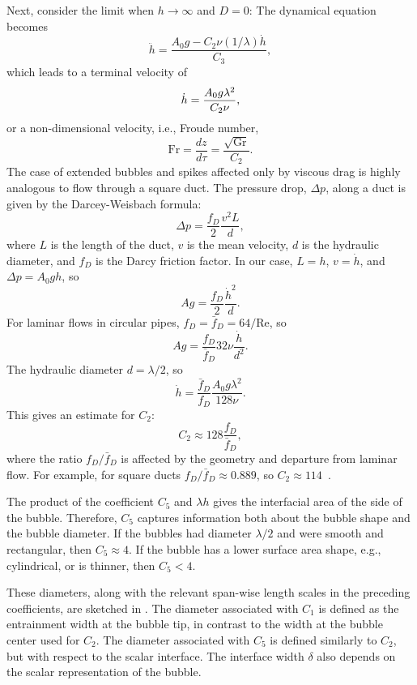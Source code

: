 Next, consider the limit when $h \rightarrow \infty$ and $D = 0$:
The dynamical equation becomes
\begin{equation}
\ddot{h} = \frac{A_0 g - C_2 \nu (1/\lambda) \dot{h}}{C_3},
\end{equation}
which leads to a terminal velocity of
\begin{equation} \elabel{visc_vel}
\dot{h} = \frac{A_0 g \lambda^2 }{C_2 \nu},
\end{equation}
or a non-dimensional velocity, i.e., Froude number,
\begin{equation}
\text{Fr} = \frac{d z}{d \tau} = \frac{\sqrt{\text{Gr}}}{C_2}.
\end{equation}
The case of extended bubbles and spikes affected only by viscous drag is highly analogous to flow through a square duct.
The pressure drop, $\Delta p$, along a duct is given by the Darcey-Weisbach formula:
\begin{equation}
\Delta p = \frac{f_D}{2} \frac{v^2 L}{d},
\end{equation}
where $L$ is the length of the duct,
$v$ is the mean velocity,
$d$ is the hydraulic diameter,
and $f_D$ is the Darcy friction factor.
In our case, $L = h$, $v = \dot{h}$, and $\Delta p = A_0 g h$, so
\begin{equation}
A g = \frac{f_D}{2} \frac{\dot{h}^2}{d}.
\end{equation}
For laminar flows in circular pipes, $f_D = \bar{f}_D = 64 / \text{Re}$, so
\begin{equation}
A g = \frac{f_D}{\bar{f}_D} 32 \nu \frac{\dot{h}}{d^2}.
\end{equation}
The hydraulic diameter $d = \lambda / 2$, so
\begin{equation}
\dot{h} = \frac{\bar{f}_D}{f_D} \frac{A_0 g \lambda^2}{128 \nu} .
\end{equation}
This gives an estimate for $C_2$:
\begin{equation}
C_2 \approx 128 \frac{f_D}{\bar{f}_D},
\end{equation}
where the ratio $f_D / \bar{f}_D$ is affected by the geometry and departure from laminar flow.
For example, for square ducts $f_D/\bar{f}_D \approx 0.889$, so $C_2 \approx 114$~\cite{ghiaasiaan2011convective}. 

The product of the coefficient $C_5$ and $\lambda h$ gives the interfacial area of the side of the bubble.
Therefore, $C_5$ captures information both about the bubble shape and the bubble diameter.
If the bubbles had diameter $\lambda / 2$ and were smooth and rectangular, then $C_5 \approx 4$.
If the bubble has a lower surface area shape, e.g., cylindrical, or is thinner, then $C_5 < 4$.

These diameters, along with the relevant span-wise length scales in the preceding coefficients, are sketched in .
The diameter associated with $C_1$ is defined as the entrainment width at the bubble tip, in contrast to the width at the bubble center used for $C_2$.
The diameter associated with $C_5$ is defined similarly to $C_2$, but with respect to the scalar interface.
The interface width $\delta$ also depends on the scalar representation of the bubble.
